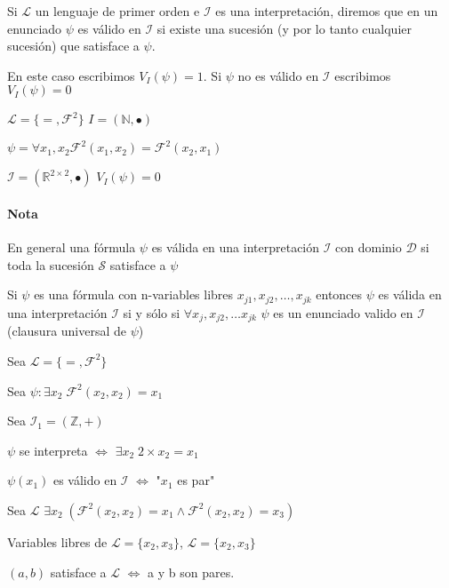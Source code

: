 \begin{definition}

Si $\mathcal{L}$ un lenguaje de primer orden e $\mathcal{I}$ es una interpretaci\'on, diremos que en un enunciado $\psi$ es v\'alido en $\mathcal{I}$ si existe una sucesi\'on (y por lo tanto cualquier sucesi\'on) que satisface a $\psi$.

En este caso escribimos $V_I(\psi) = 1$. Si $\psi$ no es v\'alido en $\mathcal{I}$ escribimos $V_I(\psi) = 0$

\end{definition}

\begin{example}

$\mathcal{L}= \{ = , \mathcal{F}^2 \}$ $I = (\mathbb{N}, \bullet)$

$\psi = \forall x_1, x_2 \mathcal{F}^2(x_1, x_2) = \mathcal{F}^2(x_2, x_1)$

\end{example}

\begin{example}

$\mathcal{I} = (\mathbb{R}^{2 \times 2}, \bullet)$ $V_I(\psi) = 0$

\end{example}

\paragraph{Nota}

En general una f\'ormula $\psi$ es v\'alida en una interpretaci\'on $\mathcal{I}$ con dominio $\mathcal{D}$ si toda la sucesi\'on $\mathcal{S}$ satisface a $\psi$

\begin{observation}

Si $\psi$ es una f\'ormula con n-variables libres $x_{j1}, x_{j2}, \ldots, x_{jk}$ entonces $\psi$ es v\'alida en una interpretaci\'on $\mathcal{I}$ si y s\'olo si $\forall x_{j}, x_{j2}, \ldots x_{jk} $ $\psi$ es un enunciado valido en $\mathcal{I}$ (clausura universal de $\psi$)

\end{observation}

\begin{example}

Sea $\mathcal{L} = \{ = , \mathcal{F}^2 \}$

Sea $\psi : \exists x_2 \; \mathcal{F}^2(x_2, x_2) = x_1$

Sea $\mathcal{I}_1 = (\mathbb{Z}, +)$

$\psi$ se interpreta $\iff$ $\exists x_2 \; 2 \times x_2 = x_1$

$\psi(x_1)$ es v\'alido en $\mathcal{I}$ $\iff$ "$x_1$ es par"

Sea $\mathcal{L}$ $\exists x_2 \; (\mathcal{F}^2(x_2, x_2) = x_1 \land \mathcal{F}^2(x_2, x_2) = x_3)$

Variables libres de $\mathcal{L} = \{ x_2, x_3\}$, $\mathcal{L} = \{ x_2, x_3\}$

$(a, b)$ satisface a $\mathcal{L}$ $\iff$ a y b son pares.

\end{example}

